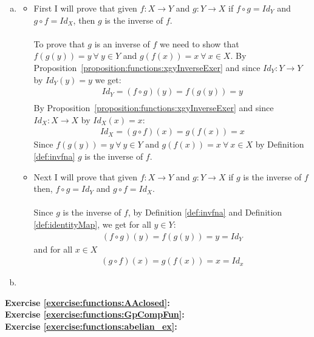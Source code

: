 \begin{enumerate}[(a)]
\item \label{InverseIdentityExers-Comp=Id}
	\begin{itemize}
	\item 
	First I will prove that given $f\colon X\to Y$ and $g\colon Y\to X$ if $f\circ g = Id_{Y}$ and $g\circ f = Id_{X}$, then $g$ is the inverse of $f$.\\
	\\
	To prove that $g$ is an inverse of $f$ we need to show that $f(g(y)) = y\ \forall\ y\in Y$ and $g(f(x)) = x\ \forall\ x\in X$. By  Proposition~\ref{proposition:functions:xgyInverseExer} and since $Id_{Y}\colon Y\to Y$ by $Id_{Y}(y) = y$ we get:
	\begin{align*}
	Id_{Y} = (f\circ g)(y) = f(g(y)) = y\\
	\end{align*}
	By Proposition~\ref{proposition:functions:xgyInverseExer} and since $Id_{X}\colon X\to X$ by $Id_{X}(x) = x$:
	\begin{align*}
	Id_{X} = (g\circ f)(x) = g(f(x)) = x
	\end{align*}
	Since $f(g(y)) = y\ \forall\ y\in Y$ and $g(f(x)) = x\ \forall\ x\in X$ by Definition \ref{def:invfna} $g$ is the inverse of $f$.
            
	\item
	Next I will prove that given $f\colon X\to Y$ and $g\colon Y\to X$ if $g$ is the inverse of $f$ then, $f\circ g = Id_{Y}$ and $g\circ f = Id_{X}$.\\
	\\           
	Since $g$ is the inverse of $f$, by Definition \ref{def:invfna} and Definition \ref{def:identityMap}, we get for all $y\in Y$:
	\begin{align*}
	(f\circ g)(y) = f(g(y)) = y = Id_{Y}
	\end{align*}
   and for all $x\in X$
	\begin{align*}
	(g\circ f)(x) = g(f(x)) = x = Id_{x}
	\end{align*}
	\end{itemize}
	
\item \label{InverseIdentityExers-InvOfInv}
\end{enumerate}


\noindent\textbf{Exercise \ref{exercise:functions:AAclosed}:}\\

\noindent\textbf{Exercise \ref{exercise:functions:GpCompFun}:}\\

\noindent\textbf{Exercise \ref{exercise:functions:abelian_ex}:}\\